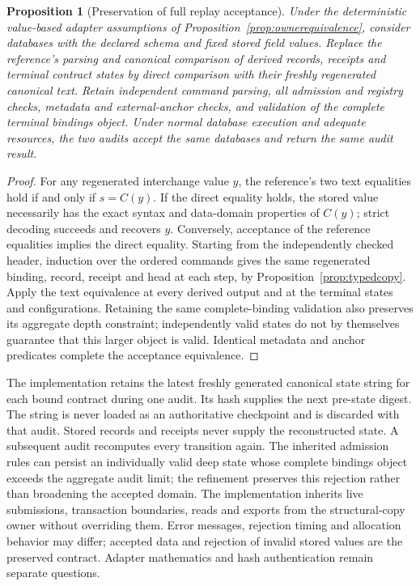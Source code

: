 \documentclass[11pt,a4paper]{article}
\newtheorem{proposition}[theorem]{Proposition}
\theoremstyle{definition}\newtheorem{definition}[theorem]{Definition}
\begin{document}
\begin{proposition}[Preservation of full replay acceptance]\label{prop:replayaudit}
Under the deterministic value-based adapter assumptions of Proposition~\ref{prop:ownerequivalence}, consider databases with the declared schema and fixed stored field values. Replace the reference's parsing and canonical comparison of derived records, receipts and terminal contract states by direct comparison with their freshly regenerated canonical text. Retain independent command parsing, all admission and registry checks, metadata and external-anchor checks, and validation of the complete terminal bindings object. Under normal database execution and adequate resources, the two audits accept the same databases and return the same audit result.
\end{proposition}
\begin{proof}
For any regenerated interchange value $y$, the reference's two text equalities hold if and only if $s=C(y)$. If the direct equality holds, the stored value necessarily has the exact syntax and data-domain properties of $C(y)$; strict decoding succeeds and recovers $y$. Conversely, acceptance of the reference equalities implies the direct equality. Starting from the independently checked header, induction over the ordered commands gives the same regenerated binding, record, receipt and head at each step, by Proposition~\ref{prop:typedcopy}. Apply the text equivalence at every derived output and at the terminal states and configurations. Retaining the same complete-binding validation also preserves its aggregate depth constraint; independently valid states do not by themselves guarantee that this larger object is valid. Identical metadata and anchor predicates complete the acceptance equivalence.
\end{proof}

The implementation retains the latest freshly generated canonical state string for each bound contract during one audit. Its hash supplies the next pre-state digest. The string is never loaded as an authoritative checkpoint and is discarded with that audit. Stored records and receipts never supply the reconstructed state. A subsequent audit recomputes every transition again. The inherited admission rules can persist an individually valid deep state whose complete bindings object exceeds the aggregate audit limit; the refinement preserves this rejection rather than broadening the accepted domain. The implementation inherits live submissions, transaction boundaries, reads and exports from the structural-copy owner without overriding them. Error messages, rejection timing and allocation behavior may differ; accepted data and rejection of invalid stored values are the preserved contract. Adapter mathematics and hash authentication remain separate questions.
\end{document}
